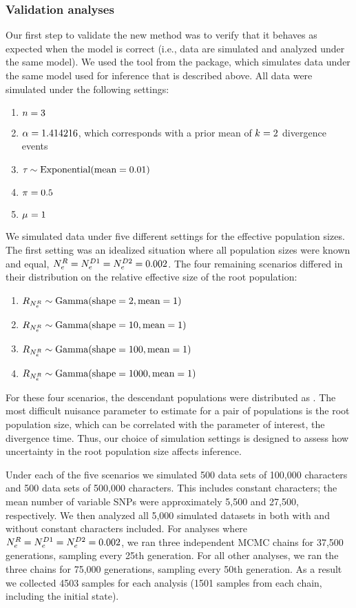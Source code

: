 \subsubsection{Validation analyses}
Our first step to validate the new method was to verify that it behaves as
expected when the model is correct (i.e., data are simulated and analyzed under
the same model).
We used the \simcoevolity tool from the \ecoevolity package, which simulates
data under the same model used for inference that is described above.
All data were simulated under the following settings:
\begin{enumerate}
    \item $\ncomparisons = 3$
    \item $\concentration = 1.414216$, which corresponds with a prior mean of
        $\nevents = 2$ divergence events
    \item $\divtime \sim \dexponential{0.01}$
    \item $\gfreq = 0.5$
    \item $\murate = 1$
\end{enumerate}
We simulated data under five different settings for the effective population
sizes.
The first setting was an idealized situation where all population sizes were
known and equal,
$\epopsize[\rootpopindex] = 
\epopsize[\descendantpopindex{1}] =
\epopsize[\descendantpopindex{2}] = 0.002$.
The four remaining scenarios differed in their distribution on the relative
effective size of the root population:
\begin{enumerate}
    \item $\rootrelativepopsize \sim \dgamma{2}{1}$
    \item $\rootrelativepopsize \sim \dgamma{10}{1}$
    \item $\rootrelativepopsize \sim \dgamma{100}{1}$
    \item $\rootrelativepopsize \sim \dgamma{1000}{1}$
\end{enumerate}
For these four scenarios, the descendant populations were distributed as
.
The most difficult nuisance parameter to estimate for a pair of populations is
the root population size, which can be correlated with the parameter of
interest, the divergence time.
Thus, our choice of simulation settings is designed to assess how uncertainty
in the root population size affects inference.

Under each of the five scenarios we simulated 500 data sets of 100,000
characters and 500 data sets of 500,000 characters.
This includes constant characters; the mean number of variable SNPs were
approximately 5,500 and 27,500, respectively.
We then analyzed all 5,000 simulated datasets in \ecoevolity both with and
without constant characters included.
For analyses where 
$\epopsize[\rootpopindex] = 
\epopsize[\descendantpopindex{1}] =
\epopsize[\descendantpopindex{2}] = 0.002$,
we ran
three independent MCMC chains for 37,500 generations, sampling every
25th generation.
For all other analyses, we ran the three chains for 75,000 generations,
sampling every 50th generation.
As a result we collected 4503 samples for each analysis (1501 samples from each
chain, including the initial state).

